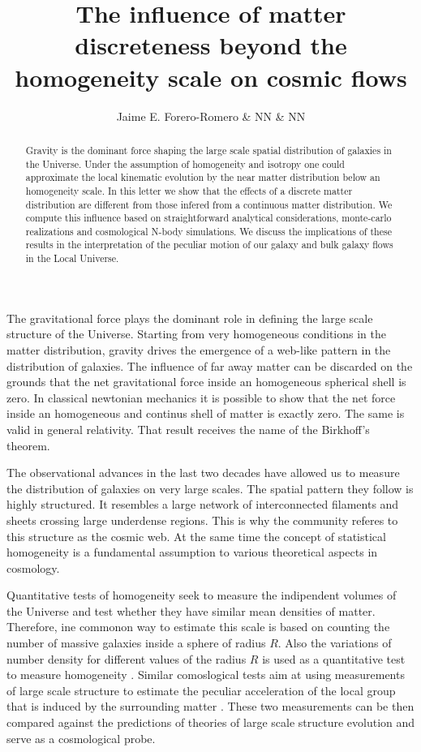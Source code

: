 \documentclass{article}
\title{The influence of matter discreteness beyond the homogeneity
  scale on cosmic flows}  \author{Jaime E. Forero-Romero \& NN \& NN}
\begin{document}
\maketitle
\begin{abstract}

Gravity is the dominant force shaping the large scale spatial
distribution of galaxies in the Universe. Under the assumption of
homogeneity and isotropy one could approximate the local
kinematic evolution by the near matter distribution below an
homogeneity scale. In this letter we show that the effects of a
discrete matter distribution are different from those infered from a
continuous matter distribution. We compute this influence based on
straightforward analytical considerations, monte-carlo realizations
and cosmological N-body simulations. We discuss the implications of
these results in the interpretation of the peculiar motion of our
galaxy and bulk galaxy flows in the Local Universe.


\end{abstract}

The gravitational force plays the dominant role in
defining the large scale structure of the Universe. Starting from very
homogeneous conditions in the matter distribution, gravity drives the emergence
of a web-like pattern in the distribution of galaxies. The influence of
far away matter can be discarded on the grounds that the net
gravitational force inside an homogeneous spherical shell is zero. In
classical newtonian mechanics it is possible to show that the net
force inside an homogeneous and continus shell of matter is exactly
zero. The same is valid in general relativity. That result receives
the name of the Birkhoff's theorem.  

The observational advances in the last two decades have allowed us
to measure the distribution of galaxies on very large scales. The
spatial pattern they follow is highly structured. It resembles a
large network of interconnected filaments and sheets crossing large
underdense regions.  This is why the community referes to this
structure as the cosmic web. At the same time the concept of
statistical homogeneity is a fundamental assumption to various
theoretical aspects in cosmology. 

Quantitative tests of homogeneity seek to measure the indipendent
volumes of the Universe and test whether they have similar mean
densities of matter. Therefore, ine commonon way to estimate this
scale is based on counting the number of massive galaxies inside a
sphere of radius $R$. Also the variations of number density for
different values of the radius $R$ is used as a quantitative test to
measure homogeneity \cite{Hogg2005}. 
Similar comoslogical tests aim at using measurements of large scale
structure to estimate the peculiar acceleration of the local group
that is induced by the surrounding matter
\cite{Gibelyou2012,Bilicki2012}. These two measurements can be then
compared against the predictions of theories of large scale structure
evolution and serve as a cosmological probe. 
\end{document}

